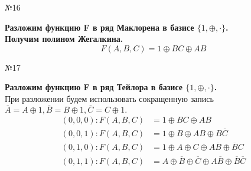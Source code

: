 \documentclass[]{article}
\begin{document}
	\begin{center}\begin{large}{№16}\end{large}\end{center}
	\textbf{Разложим функцию F в ряд Маклорена в базисе $\{1,\oplus,\cdot\}$.\\
		Получим полином Жегалкина.}
	\begin{equation}
		F(A,B,C)=1\oplus BC\oplus AB
	\end{equation}
	
	\begin{center}\begin{large}{№17}\end{large}\end{center}
	\textbf{Разложим функцию F в ряд Тейлора в базисе $\{1,\oplus,\cdot\}$.\\}
	При разложении будем использовать сокращенную запись $\overline{A}=A\oplus 1,\overline{B} = B\oplus1,\overline{C}=C\oplus1.$
	\begin{align*}
	(0,0,0):F(A,B,C)&=1\oplus BC\oplus AB\\
	(0,0,1):F(A,B,C)&=1\oplus B\oplus AB\oplus B\overline{C}\\
	(0,1,0):F(A,B,C)&=1\oplus A\oplus C\oplus A\overline{B}\oplus \overline{B}C\\
	(0,1,1):F(A,B,C)&=A\oplus \overline{B}\oplus \overline{C}\oplus A\overline{B}\oplus\overline{B}\overline{C}
	\end{align*}
\end{document}
